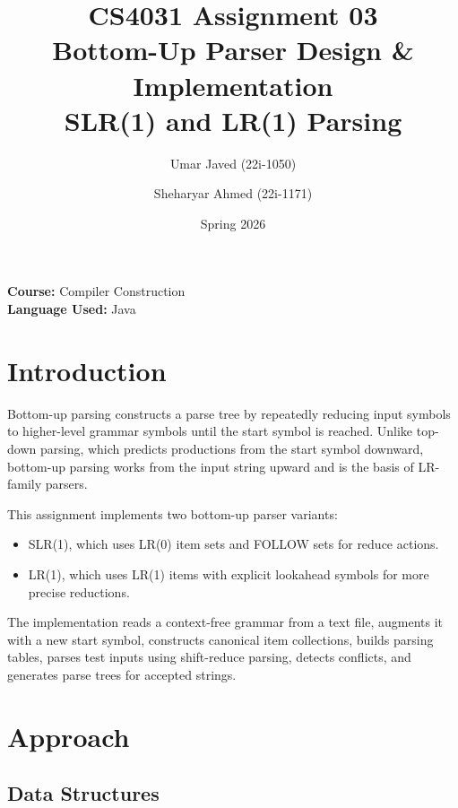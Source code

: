 \documentclass[12pt]{article}
\title{\textbf{CS4031 Assignment 03}\\Bottom-Up Parser Design \& Implementation\\SLR(1) and LR(1) Parsing}
\author{Umar Javed (22i-1050) \and Sheharyar Ahmed (22i-1171)}
\date{Spring 2026}
\begin{document}
\maketitle
\thispagestyle{empty}
\vspace{0.5cm}

\noindent\textbf{Course:} Compiler Construction\\
\textbf{Language Used:} Java

\newpage
\tableofcontents
\newpage

\section{Introduction}

Bottom-up parsing constructs a parse tree by repeatedly reducing input symbols to higher-level grammar symbols until the start symbol is reached. Unlike top-down parsing, which predicts productions from the start symbol downward, bottom-up parsing works from the input string upward and is the basis of LR-family parsers.

This assignment implements two bottom-up parser variants:
\begin{itemize}[leftmargin=1.5em]
    \item SLR(1), which uses LR(0) item sets and FOLLOW sets for reduce actions.
    \item LR(1), which uses LR(1) items with explicit lookahead symbols for more precise reductions.
\end{itemize}

The implementation reads a context-free grammar from a text file, augments it with a new start symbol, constructs canonical item collections, builds parsing tables, parses test inputs using shift-reduce parsing, detects conflicts, and generates parse trees for accepted strings.

\section{Approach}

\subsection{Data Structures}
\end{document}
